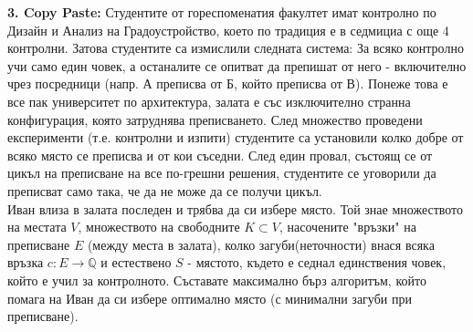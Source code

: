 \documentclass[fleqn,12pt]{article}
\begin{document}
\begin{flushleft}
\textbf{3. Copy Paste:} Студентите от гореспоменатия факултет имат контролно по Дизайн и Анализ на Градоустройство, което по традиция е в седмициа с още 4 контролни. Затова студентите са измислили следната система: За всяко контролно учи само един човек, а останалите се опитват да препишат от него - включително чрез посредници (напр. А преписва от Б, който преписва от В). Понеже това е все пак университет по архитектура, залата е със изключително странна конфигурация, която затруднява преписването. След множество проведени експерименти (т.е. контролни и изпити) студентите са установили колко добре от всяко място се преписва и от кои съседни. След един провал, състоящ се от цикъл на преписване на все по-грешни решения, студентите се уговорили да преписват само така, че да не може да се получи цикъл. \\
\qquad Иван влиза в залата последен и трябва да си избере място. Той знае множеството на местата $V$, множеството на свободните $K \subset V$, насочените "връзки" на преписване $E$ (между места в залата), колко загуби(неточности) внася всяка връзка $c : E \rightarrow \mathbb{Q} $ и естествено $S$ - мястото, където е седнал единствения човек, който е учил за контролното. Съставате максимално бърз алгоритъм, който помага на Иван да си избере оптимално място (с минимални загуби при преписване).

\end{flushleft}
\end{document}
